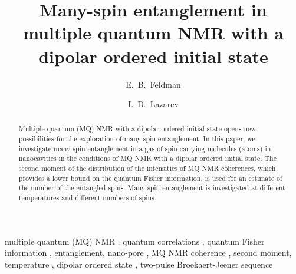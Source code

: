 

\usepackage{amsmath}
\usepackage{amssymb}

\usepackage{soul,color}
\usepackage{textcomp}

\usepackage{lineno,hyperref}
\modulolinenumbers[1]

\newcommand{\tr}[1]{\mathrm{Tr} \left\{ #1 \right\}}
\newcommand{\sx}{I_\mathrm{x}}
\newcommand{\sy}{I_\mathrm{y}}
\newcommand{\sz}{I_\mathrm{z}}
\newcommand{\hdz}{H_\mathrm{dz}}


%





\begin{frontmatter}

\title{Many-spin entanglement in multiple quantum NMR with a dipolar ordered initial state}

\author[icp]{E.~B.~Feldman}
\author[icp,msu]{I.~D.~Lazarev} %

\address[icp]{Institute of Problems of Chemical Physics of Russian Academy of Sciences, \\ Chernogolovka, Moscow Region, Russia 142432}
\address[msu]{Faculty of Fundamental Physical-Chemical Engineering, Lomonosov Moscow State University, GSP-1, Moscow, Russia 119991}



\begin{abstract}
Multiple quantum (MQ) NMR with a dipolar ordered initial state opens new possibilities for the exploration of many-spin entanglement.
In this paper, we investigate many-spin entanglement in a gas of spin-carrying molecules (atoms) in nanocavities
in the conditions of MQ NMR with a dipolar ordered initial state.
The second moment of the distribution of the intensities of MQ NMR coherences,
which provides a lower bound on the quantum Fisher information,
is used for an estimate of the number of the entangled spins.
Many-spin entanglement is investigated at different temperatures and different numbers of spins.
\end{abstract}

\begin{keyword}
multiple quantum (MQ) NMR \sep
quantum correlations \sep
quantum Fisher information \sep
entanglement, nano-pore \sep
MQ NMR coherence \sep
second moment, temperature \sep
dipolar ordered state \sep
two-pulse Broekaert-Jeener sequence
\end{keyword}

\end{frontmatter}

